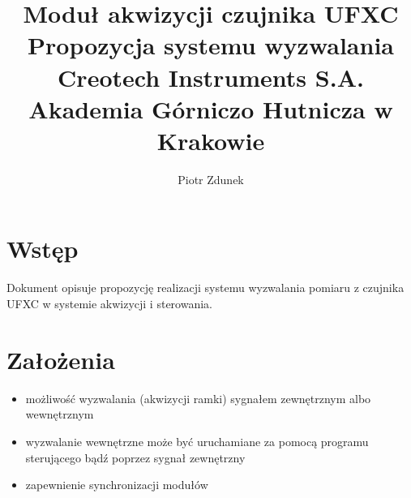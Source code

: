 \documentclass[a4paper,11pt,oneside]{article}  %
\title{Moduł akwizycji czujnika UFXC\\ Propozycja systemu wyzwalania \\[10pt] \large{Creotech Instruments S.A.} \\ \large{Akademia Górniczo Hutnicza w Krakowie}}
\author{Piotr Zdunek}
\begin{document}
%





\maketitle



\lstset{escapechar=@,style=custom}

\section{Wstęp} 
Dokument opisuje propozycję realizacji systemu wyzwalania pomiaru z czujnika UFXC w systemie akwizycji i sterowania. 

\section{Założenia}

\begin{itemize}
\item możliwość wyzwalania (akwizycji ramki) sygnałem zewnętrznym albo wewnętrznym
\item wyzwalanie wewnętrzne może być uruchamiane za pomocą programu sterującego bądź poprzez sygnał zewnętrzny
\item zapewnienie synchronizacji modułów
\end{itemize}
\end{document}
